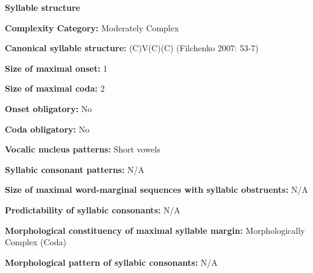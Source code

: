 \begin{styleBody}
\textbf{Syllable structure}
\end{styleBody}

\begin{styleBody}
\textbf{Complexity Category:} Moderately Complex
\end{styleBody}

\begin{styleBody}
\textbf{Canonical syllable structure:} (C)V(C)(C)\textbf{ }(Filchenko 2007: 53-7)
\end{styleBody}

\begin{styleBody}
\textbf{Size of maximal onset:} 1
\end{styleBody}

\begin{styleBody}
\textbf{Size of maximal coda:} 2
\end{styleBody}

\begin{styleBody}
\textbf{Onset obligatory:} No
\end{styleBody}

\begin{styleBody}
\textbf{Coda obligatory:} No
\end{styleBody}

\begin{styleBody}
\textbf{Vocalic nucleus patterns:} Short vowels
\end{styleBody}

\begin{styleBody}
\textbf{Syllabic consonant patterns:} N/A
\end{styleBody}

\begin{styleBody}
\textbf{Size of maximal word{}-marginal sequences with syllabic obstruents:} N/A
\end{styleBody}

\begin{styleBody}
\textbf{Predictability of syllabic consonants:} N/A
\end{styleBody}

\begin{styleBody}
\textbf{Morphological constituency of maximal syllable margin:} Morphologically Complex (Coda)
\end{styleBody}

\begin{styleBody}
\textbf{Morphological pattern of syllabic consonants:} N/A
\end{styleBody}

